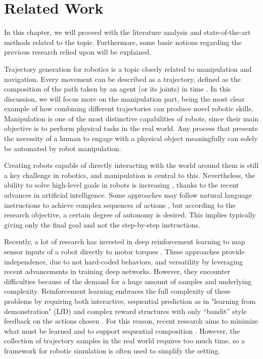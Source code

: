 \chapter{Related Work} %
\label{chap:background}

In this chapter, we will proceed with the literature analysis and state-of-the-art methods related to the topic. Furthermore, some basic notions regarding the previous research relied upon will be explained.

Trajectory generation for robotics is a topic closely related to manipulation and navigation. Every movement can be described as a trajectory, defined as the composition of the path taken by an agent (or its joints) in time \cite{biagiotti2008trajectory}. 
In this discussion, we will focus more on the manipulation part, being the most clear example of how combining different trajectories can produce novel robotic skills. Manipulation is one of the most distinctive capabilities of robots, since their main objective is to perform physical tasks in the real world. Any process that presents the necessity of a human to engage with a physical object meaningfully can solely be automated by robot manipulation. \cite{rosen2022role}

Creating robots capable of directly interacting with the world around them is still a key challenge in robotics, and manipulation is central to this. \cite{kroemer2021review} 
Nevertheless, the ability to solve high-level goals in robots is increasing \cite{gupta2019relay}, \cite{simeonov2021long} thanks to the recent advances in artificial intelligence.  
Some approaches may follow natural language instructions to achieve complex sequences of actions \cite{hu2019hierarchical}, but according to the research objective, a certain degree of autonomy is desired. This implies typically giving only the final goal and not the step-by-step instructions. 

Recently, a lot of research has invested in deep reinforcement learning to map sensor inputs of a robot
directly to motor torques \cite{khazatsky2021can}. These approaches provide independence, due to not hard-coded behaviors, and versatility by leveraging recent advancements in training deep networks. However, they encounter difficulties because of the demand for a huge amount of samples and underlying complexity. Reinforcement learning embraces the full complexity of these problems by requiring both interactive, sequential prediction as in "learning from demonstration" (LfD) and complex reward structures with only “bandit” style feedback on the actions chosen \cite{kober2013reinforcement}. 
For this reason, recent research aims to minimize what must be learned and to support sequential composition \cite{rosen2022role}. However, the collection of trajectory samples in the real world requires too much time, so a framework for robotic simulation is often used to simplify the setting. 

